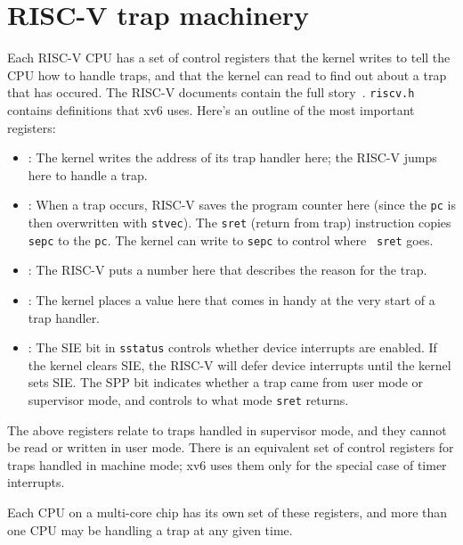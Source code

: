 \section{RISC-V trap machinery}

Each RISC-V CPU has a set of control registers that the kernel writes to
tell the CPU how to handle traps, and that the kernel can read
to find out about a trap that has occured. The RISC-V documents
contain the full story~\cite{riscv:priv}. {\tt riscv.h}
 contains definitions that xv6 uses. Here's
an outline of the most important registers:

\begin{itemize}

\item {}: The kernel writes the address of its trap handler
  here; the RISC-V jumps here to handle a trap.

\item {}: When a trap occurs, RISC-V saves the program counter
  here (since the {\tt pc} is then overwritten with {\tt stvec}). The
  {\tt sret} (return from trap) instruction copies {\tt sepc} to the
  {\tt pc}. The kernel can write to {\tt sepc} to control where {\tt
    sret} goes.

\item {}: The RISC-V puts a number here that describes
the reason for the trap.

\item {}: The kernel places a value here that comes in
  handy at the very start of a trap handler.

\item {}: The SIE bit in {\tt sstatus}
  controls whether device interrupts
  are enabled. If the kernel clears SIE, the RISC-V will defer
  device interrupts until the kernel sets SIE. The SPP bit
  indicates whether a trap came from user mode or supervisor
  mode, and controls to what mode {\tt sret} returns.

\end{itemize}

The above registers relate to traps handled in supervisor mode, and they
cannot be read or written in user mode. There is an equivalent set of
control registers for traps handled in machine mode; xv6 uses
them only for the special case of timer interrupts.

Each CPU on a multi-core chip has its own set of these registers,
and more than one CPU may be handling a trap at any given time.

